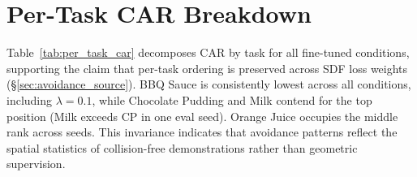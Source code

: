 \begin{table}[h]
\centering
\caption{Per-task TSR (\%) at 30K training steps. Baseline reports the unified seed-7 re-evaluation (aggregate TSR\,=\,71.5\%). LoRA-only reports 3-seed means (re-evaluated with unified seed-7 protocol); SDF conditions report 3-seed means.}
\label{tab:per_task_tsr}
\vspace{2pt}
\footnotesize
{}
\end{table}

\section{Per-Task CAR Breakdown}\label{sec:appendix_pertask_car}

Table~\ref{tab:per_task_car} decomposes CAR by task for all fine-tuned conditions, supporting the claim that per-task ordering is preserved across SDF loss weights (\S\ref{sec:avoidance_source}). BBQ Sauce is consistently lowest across all conditions, including $\lambda = 0.1$, while Chocolate Pudding and Milk contend for the top position (Milk exceeds CP in one eval seed). Orange Juice occupies the middle rank across seeds. This invariance indicates that avoidance patterns reflect the spatial statistics of collision-free demonstrations rather than geometric supervision.

